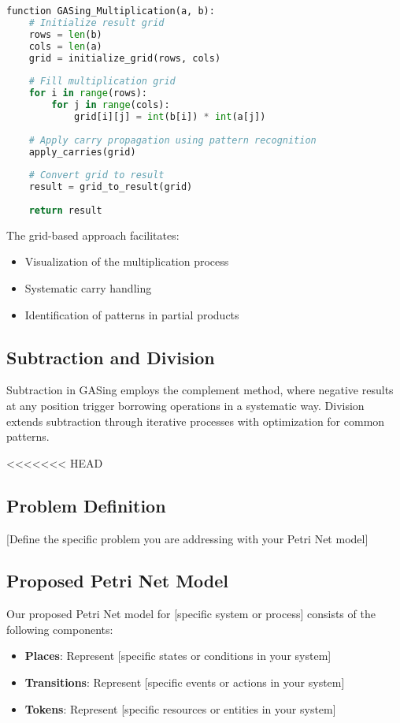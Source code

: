 \begin{lstlisting}[language=Python, caption=GASing Multiplication Algorithm]
function GASing_Multiplication(a, b):
    # Initialize result grid
    rows = len(b)
    cols = len(a)
    grid = initialize_grid(rows, cols)
    
    # Fill multiplication grid
    for i in range(rows):
        for j in range(cols):
            grid[i][j] = int(b[i]) * int(a[j])
    
    # Apply carry propagation using pattern recognition
    apply_carries(grid)
    
    # Convert grid to result
    result = grid_to_result(grid)
    
    return result
\end{lstlisting}

The grid-based approach facilitates:
\begin{itemize}
    \item Visualization of the multiplication process
    \item Systematic carry handling
    \item Identification of patterns in partial products
\end{itemize}

\subsection{Subtraction and Division}

Subtraction in GASing employs the complement method, where negative results at any position trigger borrowing operations in a systematic way. Division extends subtraction through iterative processes with optimization for common patterns.

<<<<<<< HEAD
\subsection{Problem Definition}

[Define the specific problem you are addressing with your Petri Net model]

\subsection{Proposed Petri Net Model}

Our proposed Petri Net model for [specific system or process] consists of the following components:

\begin{itemize}
    \item \textbf{Places}: Represent [specific states or conditions in your system]
    \item \textbf{Transitions}: Represent [specific events or actions in your system]
    \item \textbf{Tokens}: Represent [specific resources or entities in your system]
\end{itemize}

